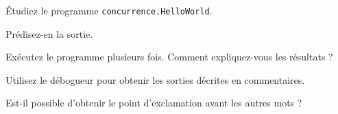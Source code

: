 
\begingroup

\begin{exercice}[Asynchronie]

  Étudiez le programme \texttt{concurrence.HelloWorld}.

  \begin{questions} 
  \item Prédisez-en la sortie.
  \item Exécutez le programme plusieurs fois. Comment expliquez-vous les résultats ?
  \item Utilisez le débogueur pour obtenir les sorties décrites en commentaires.
  \item Est-il possible d’obtenir le point d'exclamation avant les autres mots ?
  \end{questions}
  
\end{exercice}

\endgroup
\endinput
